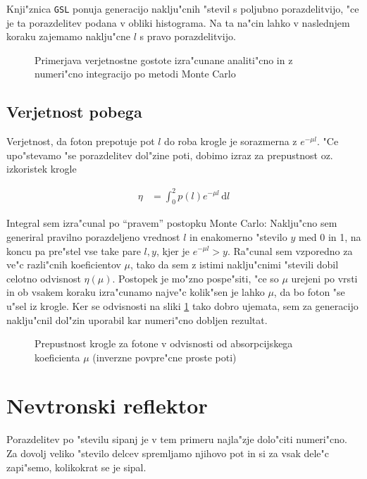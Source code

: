 \documentclass[a4paper,10pt]{article}
\newcommand{\dd}{\,\mathrm{d}}
\begin{document}
Knji"znica \texttt{GSL} ponuja generacijo naklju"cnih "stevil s poljubno porazdelitvijo, "ce je ta porazdelitev podana v obliki histograma. Na ta na"cin lahko v naslednjem koraku zajemamo naklju"cne $l$ s pravo porazdelitvijo. 

\begin{figure}[h!]

\caption{Primerjava verjetnostne gostote izra"cunane analiti"cno in z numeri"cno integracijo po metodi Monte Carlo} 
\label{fig:sevanje-num}
\end{figure}


\subsection{Verjetnost pobega}
Verjetnost, da foton prepotuje pot $l$ do roba krogle je sorazmerna z $e^{-\mu l}$. "Ce upo"stevamo "se porazdelitev dol"zine poti, dobimo izraz za prepustnost oz. izkoristek krogle

\begin{align}
 \eta &= \int_0^2 p(l) e^{-\mu l} \dd l
\end{align}
 
Integral sem izra"cunal po ``pravem'' postopku Monte Carlo: Naklju"cno sem generiral pravilno porazdeljeno vrednost $l$ in enakomerno "stevilo $y$ med 0 in 1, na koncu pa pre"stel vse take pare $l,y$, kjer je $e^{-\mu l} > y$. Ra"cunal sem vzporedno za ve"c razli"cnih koeficientov $\mu$, tako da sem z istimi naklju"cnimi "stevili dobil celotno odvisnost $\eta(\mu)$. Postopek je mo"zno pospe"siti, "ce so $\mu$ urejeni po vrsti in ob vsakem koraku izra"cunamo najve"c kolik"sen je lahko $\mu$, da bo foton "se u"sel iz krogle. Ker se odvisnosti na sliki \ref{fig:sevanje-num} tako dobro ujemata, sem za generacijo naklju"cnil dol"zin uporabil kar numeri"cno dobljen rezultat. 

\begin{figure}[h!]

\caption{Prepustnost krogle za fotone v odvisnosti od absorpcijskega koeficienta $\mu$ (inverzne povpre"cne proste poti)} 
\label{fig:sevanje-prepustnost}
\end{figure}

\clearpage


\section{Nevtronski reflektor}

Porazdelitev po "stevilu sipanj je v tem primeru najla"zje dolo"citi numeri"cno. Za dovolj veliko "stevilo delcev spremljamo njihovo pot in si za vsak dele"c zapi"semo, kolikokrat se je sipal. 
\end{document}
